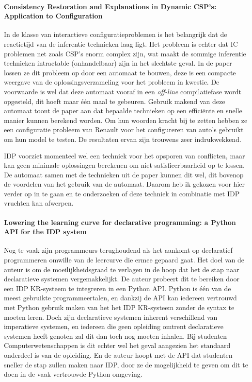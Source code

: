 \paragraph{Consistency Restoration and Explanations in Dynamic CSP's: Application to Configuration \cite{amilhastre2002consistency}}
In de klasse van interactieve configuratieproblemen is het belangrijk dat de reactietijd van de inferentie technieken laag ligt. Het probleem is echter dat IC problemen net zoals CSP's enorm complex zijn, wat maakt de sommige inferentie technieken intractable (onhandelbaar) zijn in het slechtste geval. In de paper lossen ze dit probleem op door een automaat te bouwen, deze is een compacte weergave van de oplossingsverzameling voor het probleem in kwestie. De voorwaarde is wel dat deze automaat vooraf in een \textit{off-line} compilatiefase wordt opgesteld, dit hoeft maar \'{e}\'{e}n maal te gebeuren. Gebruik makend van deze automaat toont de paper aan dat bepaalde technieken op een effici\"{e}nte en snelle manier kunnen berekend worden. Om hun woorden kracht bij te zetten hebben ze een configuratie probleem van Renault voor het configureren van auto's gebruikt om hun model te testen. De resultaten ervan zijn trouwens zeer indrukwekkend. 

IDP voorziet momenteel wel een techniek voor het opsporen van conflicten, maar kan geen minimale oplossingen berekenen om niet-satisfieerbaarheid op te lossen. De automaat samen met de technieken uit de paper kunnen dit wel, dit bovenop de voordelen van het gebruik van de automaat. Daarom heb ik gekozen voor hier verder op in te gaan en te onderzoeken of deze techniek in combinatie met IDP vruchten kan afwerpen.

\paragraph{Lowering the learning curve for declarative programming: a Python API for the IDP system \cite{vennekens2015lowering}}
Nog te vaak zijn programmeurs terughoudend als het aankomt op declaratief programmeren omwille van de leercurve die ermee gepaard gaat. Het doel van de auteur is om de moeilijkheidsgraad te verlagen in de hoop dat het de stap naar declaratieve systemen vergemakkelijkt. De auteur probeert dit te bereiken door een IDP KR-systeem te integreren in een Python API. Python is \'{e}\'{e}n van de meest gebruikte programmeertalen, en dankzij de API kan iedereen vertrouwd met Python gebruik maken van het het IDP KR-systeem zonder de syntax te moeten leren. 
Doch zijn declaratieve systemen inherent verschillend van imperatieve systemen, en iedereen die geen opleiding omtrent declaratieve systemen heeft genoten zal dit dan toch nog moeten inhalen. Bij studenten Computerwetenschappen is dit echter wel het geval aangezien het standaard onderdeel is van de opleiding. En de auteur hoopt met de API dat studenten sneller de stap zullen maken naar IDP, door ze de mogelijkheid te geven om dit te doen in de vaak vertrouwde Python omgeving.

